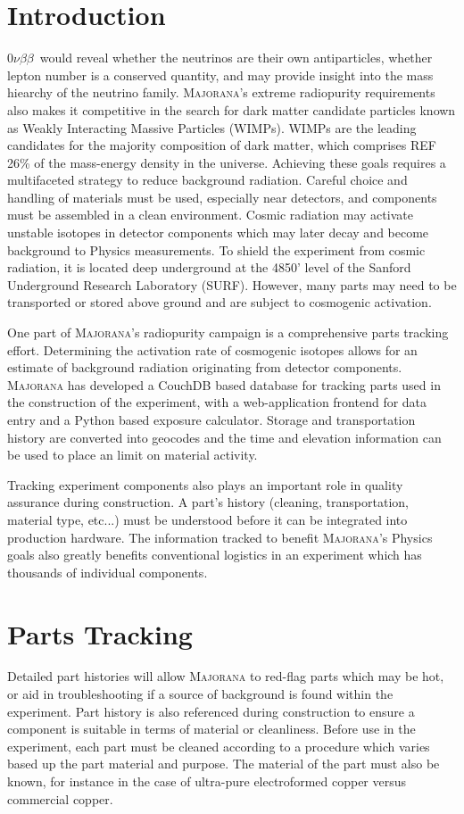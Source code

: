 \documentclass[journal]{IEEEtran}
\def\znbb{0$\nu\beta\beta$}
\begin{document}
\section{Introduction}
 \znbb\ would reveal whether the neutrinos are their own antiparticles,
whether lepton number is a conserved quantity, and may provide insight into
the mass hiearchy of the neutrino family.
\textsc{Majorana}'s extreme radiopurity requirements also makes it competitive in the search for dark
matter candidate particles known as Weakly Interacting Massive Particles (WIMPs).
WIMPs are the leading candidates for the majority composition of dark matter,
which comprises REF 26\% of the mass-energy density in the universe.
Achieving these goals requires a multifaceted strategy to reduce background radiation.
Careful choice and handling of materials must be used,
especially near detectors, and components must be assembled in a clean environment.
Cosmic radiation may activate unstable isotopes in detector components which may later decay and become background
to Physics measurements.
To shield the experiment from cosmic radiation, it is located deep underground
at the 4850' level of the Sanford Underground Research Laboratory (SURF).
However, many parts may need to be transported or stored above ground and are subject to
cosmogenic activation.

One part of \textsc{Majorana}'s radiopurity campaign is a comprehensive parts tracking effort.
Determining the activation rate of cosmogenic isotopes allows for an estimate of background
radiation originating from detector components. \textsc{Majorana} has developed a CouchDB based database
for tracking parts used in the construction of the experiment, with a web-application frontend
for data entry and a Python based exposure calculator. Storage and transportation history are
converted into geocodes and the time and elevation information can be used to place an limit
on material activity.

Tracking experiment components also plays an important role in quality assurance during 
construction. A part's history (cleaning, transportation, material type, etc...) must be 
understood before it can be integrated into production hardware. The information tracked
to benefit \textsc{Majorana}'s Physics goals also greatly benefits conventional logistics in an
experiment which has thousands of individual components.

\section{Parts Tracking}
Detailed part histories will allow \textsc{Majorana}
to red-flag parts which may be hot, or aid in troubleshooting if a source of background
is found within the experiment.
Part history is also referenced during construction to ensure a component is suitable in terms of material or cleanliness.
Before use in the experiment, each part must be cleaned according to a procedure which varies based up the part material and
purpose. The material of the part must also be known, for instance in the case of ultra-pure electroformed copper versus commercial
copper. 
\end{document}
